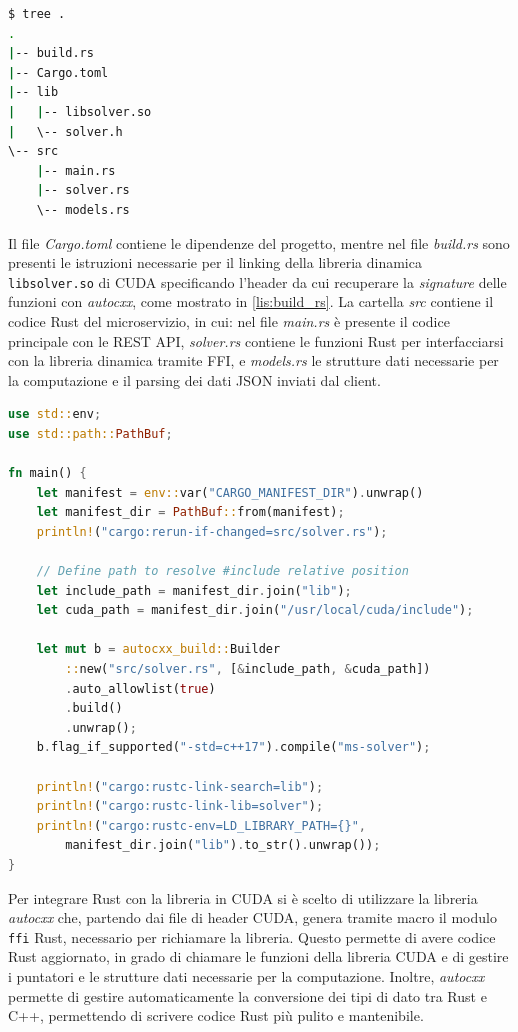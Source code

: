 \vspace{5mm}
\begin{lstlisting}[language=bash, caption=Directory del progetto, label=lis:tree]
$ tree .
.
|-- build.rs
|-- Cargo.toml
|-- lib
|   |-- libsolver.so
|   \-- solver.h
\-- src
    |-- main.rs
    |-- solver.rs
    \-- models.rs
\end{lstlisting}
\vspace{5mm}

Il file \textit{Cargo.toml} contiene le dipendenze del progetto, mentre nel file \textit{build.rs} sono presenti le istruzioni necessarie per il linking della libreria dinamica \verb|libsolver.so| di \gls{CUDA} specificando l'header da cui recuperare la \textit{signature} delle funzioni con \textit{autocxx}, come mostrato in \ref{lis:build_rs}. La cartella \textit{src} contiene il codice Rust del microservizio, in cui: nel file \textit{main.rs} è presente il codice principale con le REST \gls{API}, \textit{solver.rs} contiene le funzioni Rust per interfacciarsi con la libreria dinamica tramite \gls{FFI}, e \textit{models.rs} le strutture dati necessarie per la computazione e il parsing dei dati \gls{JSON} inviati dal client.

\newpage
\vspace{5mm}
\begin{lstlisting}[language=Rust, caption=build.rs, label=lis:build_rs]
use std::env;
use std::path::PathBuf;

fn main() {
    let manifest = env::var("CARGO_MANIFEST_DIR").unwrap()
    let manifest_dir = PathBuf::from(manifest);
    println!("cargo:rerun-if-changed=src/solver.rs");

    // Define path to resolve #include relative position
    let include_path = manifest_dir.join("lib");
    let cuda_path = manifest_dir.join("/usr/local/cuda/include");

    let mut b = autocxx_build::Builder
        ::new("src/solver.rs", [&include_path, &cuda_path])
        .auto_allowlist(true)
        .build()
        .unwrap();
    b.flag_if_supported("-std=c++17").compile("ms-solver");

    println!("cargo:rustc-link-search=lib");
    println!("cargo:rustc-link-lib=solver");
    println!("cargo:rustc-env=LD_LIBRARY_PATH={}",
        manifest_dir.join("lib").to_str().unwrap());
}
\end{lstlisting}
\vspace{5mm}


Per integrare Rust con la libreria in \gls{CUDA} si è scelto di utilizzare la libreria \textit{autocxx} che, partendo dai file di header \gls{CUDA}, genera tramite macro il modulo \verb|ffi| Rust, necessario per richiamare la libreria. Questo permette di avere codice Rust aggiornato, in grado di chiamare le funzioni della libreria \gls{CUDA} e di gestire i puntatori e le strutture dati necessarie per la computazione. Inoltre, \textit{autocxx} permette di gestire automaticamente la conversione dei tipi di dato tra Rust e C++, permettendo di scrivere codice Rust più pulito e mantenibile.

